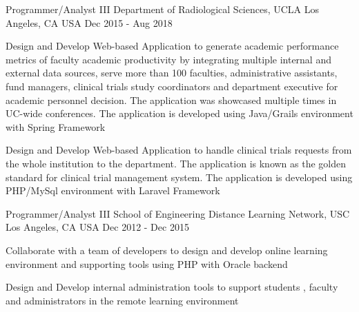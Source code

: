 \begin{cventries}
  \cventry
    {Programmer/Analyst III} %
    {Department of Radiological Sciences, UCLA} %
    {Los Angeles, CA USA} %
    {Dec 2015 - Aug 2018} %
    {
      \begin{cvitems} %
        \item {Design and Develop Web-based Application to generate academic performance metrics  of faculty academic productivity by integrating multiple internal and external data sources, serve more than 100 faculties, administrative assistants, fund managers, clinical trials study coordinators and department executive for academic personnel decision. The application was showcased multiple times in UC-wide conferences. The application is developed using Java/Grails environment with Spring Framework}
        \item {Design and Develop Web-based Application to handle clinical trials requests from the whole institution to the department. The application is known as the golden standard for clinical trial management system. The application is developed using PHP/MySql environment with Laravel Framework}       
      \end{cvitems}
    }
	
  \cventry
    {Programmer/Analyst III} %
    {School of Engineering Distance Learning Network, USC} %
    {Los Angeles, CA USA} %
    {Dec 2012 - Dec 2015} %
    {
      \begin{cvitems} %
        \item {Collaborate with a team of developers to design and develop online learning environment and supporting tools using PHP with Oracle backend}
        \item {Design and Develop internal administration tools to support students , faculty and administrators  in the remote learning environment}       
      \end{cvitems}
    }


\end{cventries}

